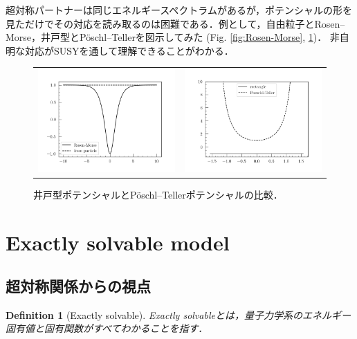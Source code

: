 \documentclass[english, dvipdfmx, a4paper]{jsarticle}
\theoremstyle{break}
\newtheorem{defn}[thm]{Definition}
\begin{document}
	超対称パートナーは同じエネルギースペクトラムがあるが，ポテンシャルの形を見ただけでその対応を読み取るのは困難である．例として，自由粒子とRosen--Morse，井戸型とP\"{o}schl--Tellerを図示してみた (Fig. \ref{fig:Rosen-Morse}, \ref{fig:Poeschl-Teller})．
	非自明な対応がSUSYを通して理解できることがわかる．
		\begin{figure}[t]
			\centering
			\begin{tabular}{cc}
				\begin{minipage}[t]{0.45\hsize}
					\centering
					\includegraphics[width=6cm]{./potentials/free-RM.png}
					\caption{自由粒子とRosen--Morseポテンシャルの比較．}
					\label{fig:Rosen-Morse}
				\end{minipage}&
				\begin{minipage}[t]{0.45\hsize}
					\centering
					\includegraphics[width=6cm]{./potentials/rectangle-PT.png}
					\caption{井戸型ポテンシャルとP\"{o}schl--Tellerポテンシャルの比較．}
					\label{fig:Poeschl-Teller}
				\end{minipage}
			\end{tabular}
		\end{figure}

	\section{Exactly solvable model}
	\subsection{超対称関係からの視点}
	\begin{defn}[Exactly solvable]
		Exactly solvableとは，量子力学系のエネルギー固有値と固有関数がすべてわかることを指す．
	\end{defn}
	
\end{document}
